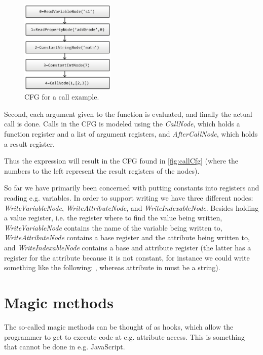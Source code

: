 \begin{figure}
	\vspace{-20pt}
	\begin{center}
		\includegraphics[width=0.40\textwidth]{images/Call-example.png}
	\end{center}
	\vspace{-10pt}
	\caption{CFG for a call example.}
	\label{fig:callCfg}
	\vspace{-10pt}
\end{figure}

Second, each argument given to the function is evaluated, and finally the actual call is done. Calls in the CFG is modeled using the \textit{CallNode}, which holds a function register and a list of argument registers, and \textit{AfterCallNode}, which holds a result register.

Thus the expression  will result in the CFG found in \autoref{fig:callCfg} 
(where the numbers to the left represent the result registers of the nodes).

So far we have primarily been concerned with putting constants into registers and reading e.g. variables. In order to support writing we have three different nodes: \textit{WriteVariableNode}, \textit{WriteAttributeNode}, and \textit{WriteIndexableNode}. Besides holding a value register, i.e. the register where to find the value being written, \textit{WriteVariableNode} contains the name of the variable being written to, \textit{WriteAttributeNode} contains a base register and the attribute being written to, and \textit{WriteIndexableNode} contains a base and attribute register (the latter has a register for the attribute because it is not constant, for instance we could write something like the following: , whereas attribute in  must be a string).



\section{Magic methods}
The so-called magic methods can be thought of as hooks, which allow the programmer to get to execute code at e.g. attribute access. This is something that cannot be done in e.g. JavaScript.

